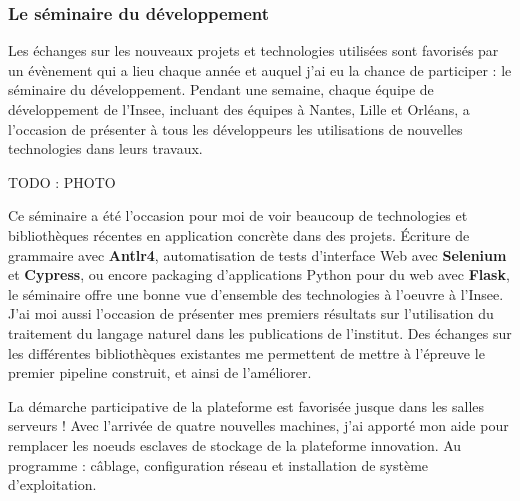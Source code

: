 \subsubsection*{Le séminaire du développement}
Les échanges sur les nouveaux projets et technologies utilisées sont favorisés par un évènement qui a lieu chaque année et auquel j'ai eu la chance de participer : le séminaire du développement. Pendant une semaine, chaque équipe de développement de l'Insee, incluant des équipes à Nantes, Lille et Orléans, a l'occasion de présenter à tous les développeurs les utilisations de nouvelles technologies dans leurs travaux.
\newline

TODO : PHOTO

Ce séminaire a été l'occasion pour moi de voir beaucoup de technologies et bibliothèques récentes en application concrète dans des projets. Écriture de grammaire avec \textbf{Antlr4}, automatisation de tests d'interface Web avec \textbf{Selenium} et \textbf{Cypress}, ou encore packaging d'applications Python pour du web avec \textbf{Flask}, le séminaire offre une bonne vue d'ensemble des technologies à l'oeuvre à l'Insee. J'ai moi aussi l'occasion de présenter mes premiers résultats sur l'utilisation du traitement du langage naturel dans les publications de l'institut. Des échanges sur les différentes bibliothèques existantes me permettent de mettre à l'épreuve le premier pipeline construit, et ainsi de l'améliorer.
\newline

La démarche participative de la plateforme est favorisée jusque dans les salles serveurs ! Avec l'arrivée de quatre nouvelles machines, j'ai apporté mon aide pour remplacer les noeuds esclaves de stockage de la plateforme innovation. Au programme : câblage, configuration réseau et installation de système d'exploitation. 

